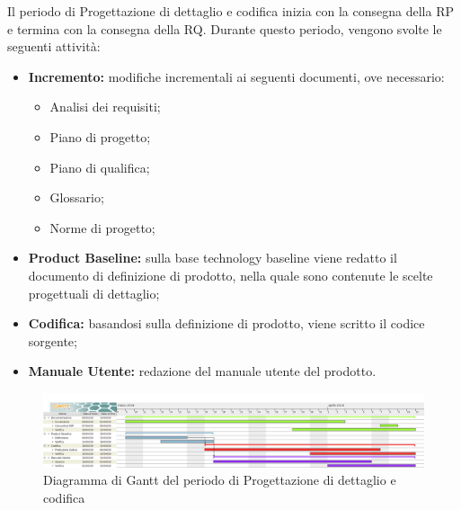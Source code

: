 Il periodo di Progettazione di dettaglio e codifica inizia con la consegna della RP e termina con la consegna della RQ.\newline
Durante questo periodo, vengono svolte le seguenti attività:
\begin{itemize}
	\item \textbf{Incremento: }modifiche incrementali ai seguenti documenti, ove necessario:
	\begin{itemize}
		\item Analisi dei requisiti;
		\item Piano di progetto;
		\item Piano di qualifica;
		\item Glossario;
		\item Norme di progetto;
	\end{itemize}
	\item \textbf{Product Baseline: }sulla base technology baseline viene redatto il documento di definizione di prodotto, nella quale sono contenute le scelte progettuali di dettaglio;
	\item \textbf{Codifica: }basandosi sulla definizione di prodotto, viene scritto il codice sorgente;
	\item \textbf{Manuale Utente: }redazione del manuale utente del prodotto. 
\end{itemize}


\begin{figure}[H]
	\includegraphics[width=1\linewidth]{Pianificazione/Progettazione_Dettaglio_Codififca.png}
	\caption{Diagramma di Gantt del periodo di Progettazione di dettaglio e codifica}
\end{figure}